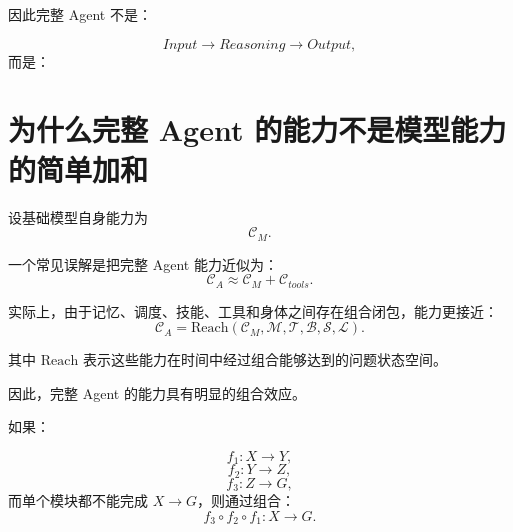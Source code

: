 因此完整 Agent 不是：

\begin{equation}
Input
\rightarrow
Reasoning
\rightarrow
Output,
\end{equation}
而是：

\begin{statementbox}
\centering
{}
\end{statementbox}

\section{为什么完整 Agent 的能力不是模型能力的简单加和}

设基础模型自身能力为
\begin{equation}
\mathcal C_M.
\end{equation}

一个常见误解是把完整 Agent 能力近似为：
\begin{equation}
\mathcal C_A
\approx
\mathcal C_M
+
\mathcal C_{tools}.
\end{equation}

实际上，由于记忆、调度、技能、工具和身体之间存在组合闭包，能力更接近：
\begin{equation}
\boxed{
\mathcal C_A
=
\mathrm{Reach}
\left(
\mathcal C_M,
\mathcal M,
\mathcal T,
\mathcal B,
\mathcal S,
\mathcal L
\right).
}
\end{equation}

其中 $\mathrm{Reach}$ 表示这些能力在时间中经过组合能够达到的问题状态空间。

因此，完整 Agent 的能力具有明显的组合效应。

如果：

\begin{equation}
f_1:
X\rightarrow Y,
\end{equation}
\begin{equation}
f_2:
Y\rightarrow Z,
\end{equation}
\begin{equation}
f_3:
Z\rightarrow G,
\end{equation}
而单个模块都不能完成 $X\rightarrow G$，则通过组合：
\begin{equation}
f_3\circ f_2\circ f_1
:
X\rightarrow G.
\end{equation}

